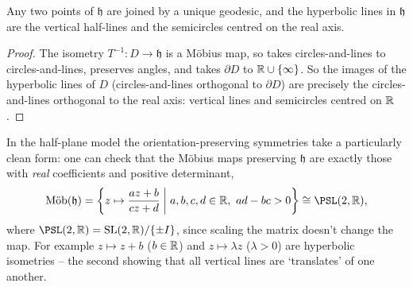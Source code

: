 \documentclass[a4paper]{scrartcl}
\newcommand{\Mob}{\text{M\"ob}}
\begin{document}
\begin{corollary}
    Any two points of $\mathfrak{h}$ are joined by a unique geodesic, and the hyperbolic lines in $\mathfrak{h}$ are the vertical half-lines and the semicircles centred on the real axis.
\end{corollary}
\begin{proof}
    The isometry $T^{-1}: D \rightarrow \mathfrak{h}$ is a M\"obius map, so takes circles-and-lines to circles-and-lines, preserves angles, and takes $\partial D$ to $\mathbb{R} \cup \{\infty\}$. So the images of the hyperbolic lines of $D$ (circles-and-lines orthogonal to $\partial D$) are precisely the circles-and-lines orthogonal to the real axis: vertical lines and semicircles centred on $\mathbb{R}$.
\end{proof}
\begin{center}
\end{center}

In the half-plane model the orientation-preserving symmetries take a particularly clean form: one can check that the M\"obius maps preserving $\mathfrak{h}$ are exactly those with \emph{real} coefficients and positive determinant,
$$
\Mob(\mathfrak{h}) = \left\{z \mapsto \frac{az + b}{cz + d} \;\middle|\; a, b, c, d \in \R, \ ad - bc > 0 \right\} \cong \PSL(2, \R),
$$
where $\PSL(2, \R) = \SL(2, \R)/\{\pm I\}$, since scaling the matrix doesn't change the map. For example $z \mapsto z + b$ ($b \in \mathbb{R}$) and $z \mapsto \lambda z$ ($\lambda > 0$) are hyperbolic isometries -- the second showing that all vertical lines are `translates' of one another.
\end{document}

